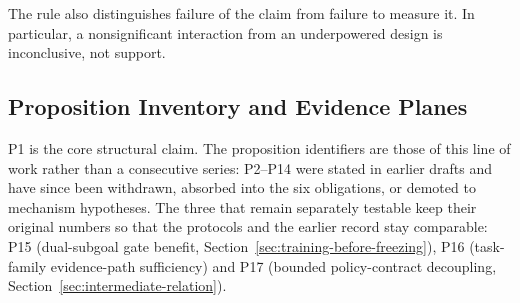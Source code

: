 \documentclass[11pt]{article}
\begin{document}
The rule also distinguishes failure of the claim from failure to measure it. In particular, a nonsignificant interaction from an underpowered design is inconclusive, not support.

\subsection{Proposition Inventory and Evidence Planes}

P1 is the core structural claim. The proposition identifiers are those of this line of work rather than a consecutive series: P2--P14 were stated in earlier drafts and have since been withdrawn, absorbed into the six obligations, or demoted to mechanism hypotheses. The three that remain separately testable keep their original numbers so that the protocols and the earlier record stay comparable: P15 (dual-subgoal gate benefit, Section~\ref{sec:training-before-freezing}), P16 (task-family evidence-path sufficiency) and P17 (bounded policy-contract decoupling, Section~\ref{sec:intermediate-relation}).
\end{document}
